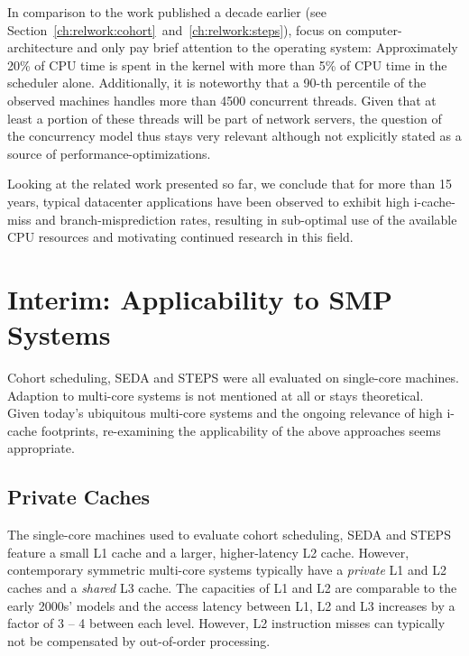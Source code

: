 \documentclass[12pt,a4paper]{book}
\begin{document}
In comparison to the work published a decade earlier (see Section~\ref{ch:relwork:cohort}~and~\ref{ch:relwork:steps}),
\citeauthor*{kanev2015profiling} focus on computer-architecture and only pay brief attention to the operating system:
Approximately 20\% of CPU time is spent in the kernel with more than 5\% of CPU time in the scheduler alone.
Additionally, it is noteworthy that a 90-th percentile of the observed machines handles more than 4500 concurrent threads.
Given that at least a portion of these threads will be part of network servers, the question of the concurrency model thus stays very relevant although not explicitly stated as a source of performance-optimizations.~\cite{kanev2015profiling}

Looking at the related work presented so far, we conclude that for more than 15 years, typical datacenter applications have been observed to exhibit high i-cache-miss and branch-misprediction rates, resulting in sub-optimal use of the available CPU resources and motivating continued research in this field.

\section{Interim: Applicability to SMP Systems}\label{ch:relwork:anasmp}
Cohort scheduling, SEDA and STEPS were all evaluated on single-core machines.
Adaption to multi-core systems is not mentioned at all or stays theoretical.~\cite{steps,harizopoulos2003case}
Given today's ubiquitous multi-core systems and the ongoing relevance of high i-cache footprints, re-examining the applicability of the above approaches seems appropriate.

\subsection{Private Caches}
The single-core machines used to evaluate cohort scheduling, SEDA and STEPS feature a small L1 cache and a larger, higher-latency L2 cache.
However, contemporary symmetric multi-core systems typically have a \emph{private} L1 and L2 caches and a \emph{shared} L3 cache.
The capacities of L1 and L2 are comparable to the early 2000s' models and the access latency between L1, L2 and L3 increases by a factor of 3 -- 4 between each level.
However, L2 instruction misses can typically not be compensated by out-of-order processing.~\cite{hennessy2002,haswellCacheLatency} %
\end{document}
